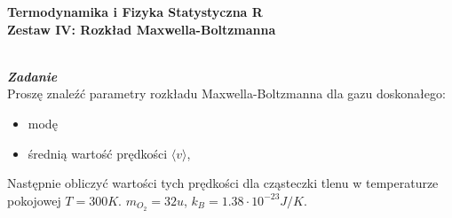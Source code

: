 \documentclass[11pt,a4paper]{article}
\newcounter{zadanie}\newcommand{\zadanie}[1][]{\addtocounter{zadanie}{1} ~\\  {\bf \emph{Zadanie \arabic{zadanie} #1 }} \\}
\begin{document}
   

\begin{centering}
  {\bf {\Large
  Termodynamika i Fizyka Statystyczna R \\
  Zestaw IV: Rozkład Maxwella-Boltzmanna
  }} \\  
\end{centering}

\zadanie[]

Proszę znaleźć parametry rozkładu Maxwella-Boltzmanna dla gazu doskonałego:
\begin{itemize}
  \item modę
  \item średnią wartość prędkości $\langle v \rangle$,
\end{itemize}

Następnie obliczyć wartości  tych prędkości dla cząsteczki tlenu 
w temperaturze pokojowej $T = 300 K$.
$m_{O_2} = 32 u$, $k_B = 1.38 \cdot 10^{-23} J/K$.
\end{document}
